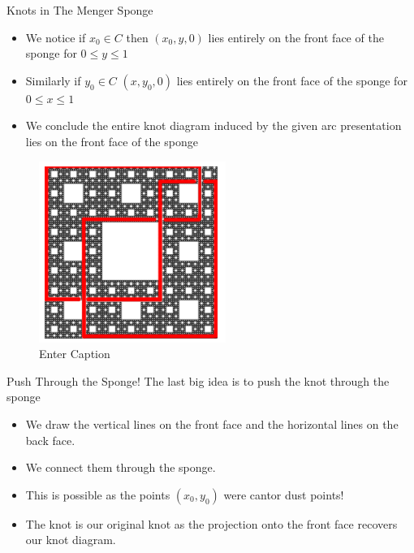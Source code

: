 \begin{frame}[c]{Knots in The Menger Sponge}
	\begin{itemize}
		\item We notice if $x_0 \in C$ then $(x_0, y,0)$ lies entirely on the front face of the sponge for $0 \leq y \leq 1$
		\item Similarly if $y_0 \in C$ $(x, y_0,0)$ lies entirely on the front face of the sponge for $0 \leq x \leq 1$
		\item We conclude the entire knot diagram induced by the given arc presentation lies on the front face of the sponge
	\end{itemize}
	
	\begin{figure}
		\centering
		\includegraphics[width=0.2\linewidth]{KnotOnFace.png}
		\caption{Enter Caption}
		\label{fig:enter-label}
	\end{figure}
\end{frame}

\begin{frame}[c]{Push Through the Sponge!}
	The last big idea is to push the knot through the sponge
	\begin{itemize}
		\item We draw the vertical lines on the front face and the horizontal lines on the back face.
		\item We connect them through the sponge.
		\item This is possible as the points $(x_0, y_0)$ were cantor dust points!
		\item The knot is our original knot as the projection onto the front face recovers our knot diagram.
	\end{itemize}
\end{frame}